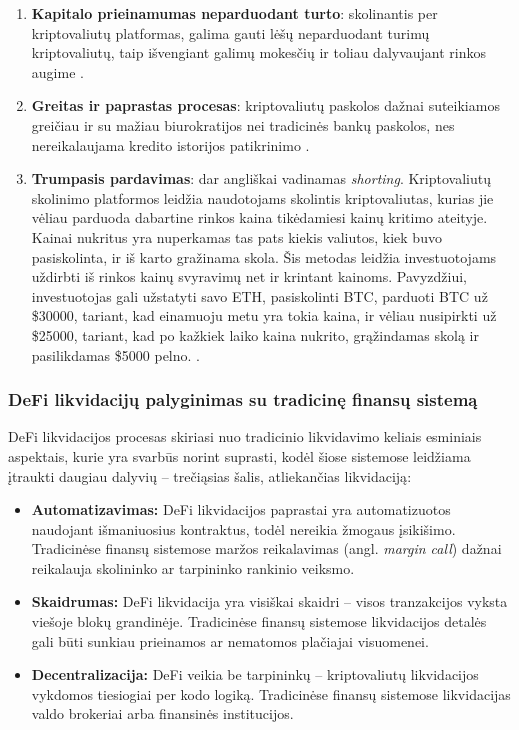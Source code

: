 \documentclass[]{VUMIFTemplateClass}
\begin{document}
\begin{enumerate}
    \item \textbf{Kapitalo prieinamumas neparduodant turto}: skolinantis per kriptovaliutų platformas, galima gauti lėšų neparduodant turimų kriptovaliutų, taip išvengiant galimų mokesčių ir toliau dalyvaujant rinkos augime \cite{kriptovaliutosio}.
    \item \textbf{Greitas ir paprastas procesas}: kriptovaliutų paskolos dažnai suteikiamos greičiau ir su mažiau biurokratijos nei tradicinės bankų paskolos, nes nereikalaujama kredito istorijos patikrinimo \cite{targettrend}.
    \item \textbf{Trumpasis pardavimas}: dar angliškai vadinamas \textit{shorting}. Kriptovaliutų skolinimo platformos leidžia naudotojams skolintis kriptovaliutas, kurias jie vėliau parduoda dabartine rinkos kaina tikėdamiesi kainų kritimo ateityje. Kainai nukritus yra nuperkamas tas pats kiekis valiutos, kiek buvo pasiskolinta, ir iš karto gražinama skola. Šis metodas leidžia investuotojams uždirbti iš rinkos kainų svyravimų net ir krintant kainoms. Pavyzdžiui, investuotojas gali užstatyti savo ETH, pasiskolinti BTC, parduoti BTC už \$30000, tariant, kad einamuoju metu yra tokia kaina, ir vėliau nusipirkti už \$25000, tariant, kad po kažkiek laiko kaina nukrito, grąžindamas skolą ir pasilikdamas \$5000 pelno.
    \cite{shortinimas}.
\end{enumerate}

\subsubsection{DeFi likvidacijų palyginimas su tradicinę finansų sistemą}
DeFi likvidacijos procesas skiriasi nuo tradicinio likvidavimo keliais esminiais aspektais, kurie yra svarbūs norint suprasti, kodėl šiose sistemose leidžiama įtraukti daugiau dalyvių – trečiąsias šalis, atliekančias likvidaciją\cite{whatisdefiliquidation}:

\begin{itemize}
    \item \textbf{Automatizavimas:} DeFi likvidacijos paprastai yra automatizuotos naudojant išmaniuosius kontraktus, todėl nereikia žmogaus įsikišimo. Tradicinėse finansų sistemose maržos reikalavimas (angl. \textit{margin call}) dažnai reikalauja skolininko ar tarpininko rankinio veiksmo.
    
    \item \textbf{Skaidrumas:} DeFi likvidacija yra visiškai skaidri – visos tranzakcijos vyksta viešoje blokų grandinėje. Tradicinėse finansų sistemose likvidacijos detalės gali būti sunkiau prieinamos ar nematomos plačiajai visuomenei.
    
    \item \textbf{Decentralizacija:} DeFi veikia be tarpininkų – kriptovaliutų likvidacijos vykdomos tiesiogiai per kodo logiką. Tradicinėse finansų sistemose likvidacijas valdo brokeriai arba finansinės institucijos.
\end{itemize}
\end{document}
